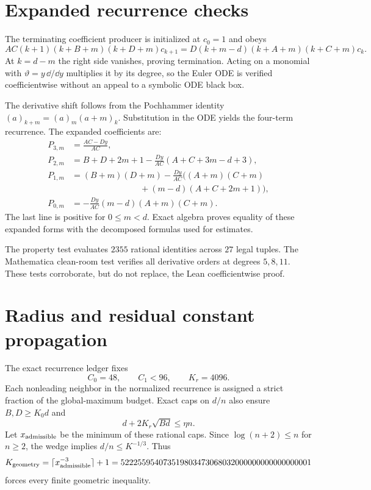 \documentclass[10pt]{article}
\begin{document}
\section{Expanded recurrence checks}\label{sup:recurrence}

The terminating coefficient producer is initialized at $c_0=1$ and obeys
\[
 AC(k+1)(k+B+m)(k+D+m)c_{k+1}
 =D(k+m-d)(k+A+m)(k+C+m)c_k.
\]
At $k=d-m$ the right side vanishes, proving termination.  Acting on a
monomial with $\vartheta=y\,\dd/\dd y$ multiplies it by its degree, so the
Euler ODE is verified coefficientwise without an appeal to a symbolic ODE
black box.

The derivative shift follows from the Pochhammer identity
$(a)_{k+m}=(a)_m(a+m)_k$.  Substitution in the ODE yields the four-term
recurrence.  The expanded coefficients are:
\begin{align*}
 P_{3,m}&=\frac{AC-Dy}{AC},\\
 P_{2,m}&=B+D+2m+1
 -\frac{Dy}{AC}(A+C+3m-d+3),\\
 P_{1,m}&=(B+m)(D+m)
 -\frac{Dy}{AC}\bigl((A+m)(C+m)\\
 &\hspace{8em}+(m-d)(A+C+2m+1)\bigr),\\
 P_{0,m}&=-\frac{Dy}{AC}(m-d)(A+m)(C+m).
\end{align*}
The last line is positive for $0\le m<d$.  Exact algebra proves equality of
these expanded forms with the decomposed formulas used for estimates.

The property test evaluates $2355$ rational identities across $27$ legal
tuples.  The Mathematica clean-room test verifies all derivative orders at
degrees $5,8,11$.  These tests corroborate, but do not replace, the Lean
coefficientwise proof.

\section{Radius and residual constant propagation}\label{sup:effectivity}

The exact recurrence ledger fixes
\[
 C_0=48,\qquad C_1<96,\qquad K_r=4096.
\]
Each nonleading neighbor in the normalized recurrence is assigned a strict
fraction of the global-maximum budget.  Exact caps on $d/n$ also ensure
$B,D\ge K_0d$ and
\[
 d+2K_r\sqrt{Bd}\le\eta n.
\]
Let $x_{\rm admissible}$ be the minimum of these rational caps.  Since
$\log(n+2)\le n$ for $n\ge2$, the wedge implies
$d/n\le K^{-1/3}$.  Thus
\[
 K_{\rm geometry}=\lceil x_{\rm admissible}^{-3}\rceil+1
 =522255954073519803473068032000000000000000001
\]
forces every finite geometric inequality.
\end{document}

